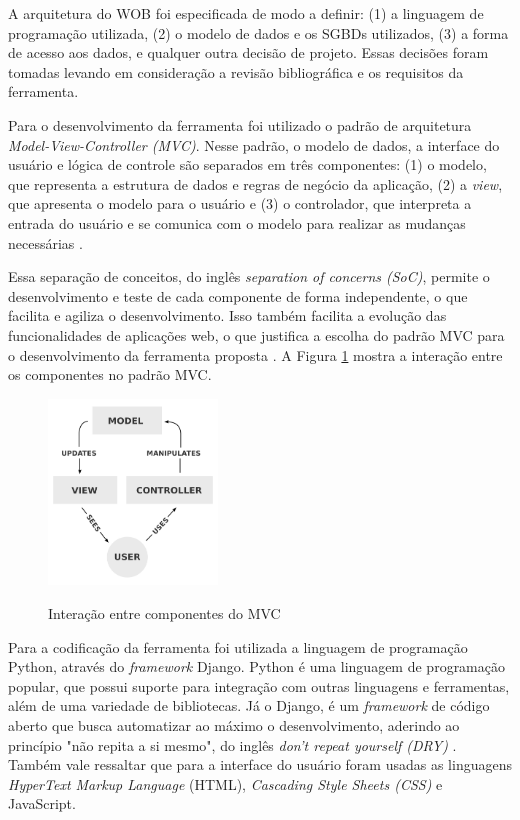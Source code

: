 A arquitetura do WOB foi especificada de modo a definir: (1) a linguagem de 
programação utilizada, (2) o modelo de dados e os SGBDs utilizados, (3) a forma de acesso 
aos dados, e qualquer outra decisão de projeto. Essas decisões foram tomadas levando em 
consideração a revisão bibliográfica e os requisitos da ferramenta.

Para o desenvolvimento da ferramenta foi utilizado o padrão de arquitetura 
\textit{Model-View-Controller (MVC)}. Nesse padrão, o modelo de dados, a interface do 
usuário e lógica de controle são separados em três componentes: (1) o modelo, que 
representa a estrutura de dados e regras de negócio da aplicação, (2) a \textit{view}, 
que apresenta o modelo para o usuário e (3) o controlador, que interpreta a entrada do 
usuário e se comunica com o modelo para realizar as mudanças necessárias \cite{plekhanova2009evaluating}. 

Essa separação de conceitos, do inglês \textit{separation of concerns (SoC)}, permite o 
desenvolvimento e teste de cada componente de forma independente, o que facilita e agiliza o 
desenvolvimento. Isso também facilita a evolução das funcionalidades de aplicações web, o que 
justifica a escolha do padrão MVC para o desenvolvimento da ferramenta proposta 
\cite{gupta2012}. A Figura \ref{fig:mvc} mostra a interação entre os componentes no 
padrão MVC.

\begin{figure}[!htb]
    \centering
    \caption{Interação entre componentes do MVC}
    \includegraphics[width=0.4\textwidth]{./04-figuras/mvc}
    \label{fig:mvc}
\end{figure}

Para a codificação da ferramenta foi utilizada a linguagem de programação Python, através do 
\textit{framework} Django. Python é uma linguagem de programação popular, que possui suporte 
para integração com outras linguagens e ferramentas, além de uma variedade de bibliotecas. 
Já o Django, é um \textit{framework} de código aberto que busca automatizar ao máximo o 
desenvolvimento, aderindo ao princípio "não repita a si mesmo", do inglês 
\textit{don’t repeat yourself (DRY)} \cite{plekhanova2009evaluating}. Também vale ressaltar 
que para a interface do usuário foram usadas as linguagens 
\textit{HyperText Markup Language} (HTML), \textit{Cascading Style Sheets (CSS)} e JavaScript.

